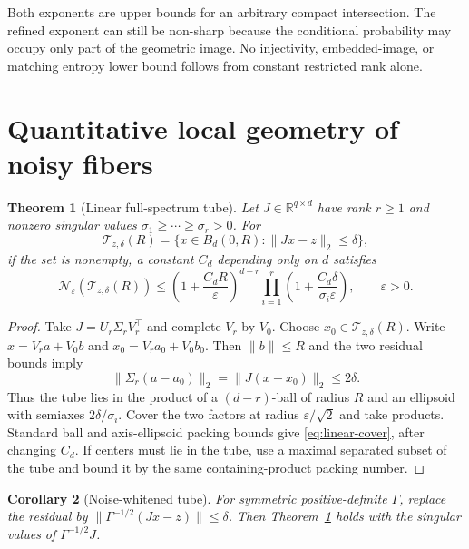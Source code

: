 \documentclass[11pt]{article}
\newtheorem{theorem}{Theorem}[section]
\newtheorem{corollary}[theorem]{Corollary}
\theoremstyle{definition}
\newcommand{\R}{\mathbb R}
\newcommand{\cN}{\mathcal N}
\begin{document}
Both exponents are upper bounds for an arbitrary compact intersection.  The
refined exponent can still be non-sharp because the conditional probability
may occupy only part of the geometric image.  No injectivity, embedded-image,
or matching entropy lower bound follows from constant restricted rank alone.

\section{Quantitative local geometry of noisy fibers}

\begin{theorem}[Linear full-spectrum tube]\label{thm:linear-tube}
Let $J\in\R^{q\times d}$ have rank $r\ge1$ and nonzero singular values
$\sigma_1\ge\cdots\ge\sigma_r>0$.  For
\[
 \mathcal T_{z,\delta}(R)
 =\{x\in B_d(0,R):\|Jx-z\|_2\le\delta\},
\]
if the set is nonempty, a constant $C_d$ depending only on $d$ satisfies
\begin{equation}\label{eq:linear-cover}
 \cN_\varepsilon(\mathcal T_{z,\delta}(R))
 \le \left(1+\frac{C_dR}{\varepsilon}\right)^{d-r}
 \prod_{i=1}^r\left(1+\frac{C_d\delta}
 {\sigma_i\varepsilon}\right),\qquad \varepsilon>0.
\end{equation}
\end{theorem}

\begin{proof}
Take $J=U_r\Sigma_rV_r^\top$ and complete $V_r$ by $V_0$.  Choose
$x_0\in\mathcal T_{z,\delta}(R)$.  Write
$x=V_ra+V_0b$ and $x_0=V_ra_0+V_0b_0$.  Then $\|b\|\le R$ and the two
residual bounds imply
\[
 \|\Sigma_r(a-a_0)\|_2=\|J(x-x_0)\|_2\le2\delta.
\]
Thus the tube lies in the product of a $(d-r)$-ball of radius $R$ and an
ellipsoid with semiaxes $2\delta/\sigma_i$.  Cover the two factors at radius
$\varepsilon/\sqrt2$ and take products.  Standard ball and axis-ellipsoid
packing bounds \citep[Chapter~4]{vershynin2018highdim} give
\eqref{eq:linear-cover}, after changing $C_d$.  If centers
must lie in the tube, use a maximal separated subset of the tube and bound it
by the same containing-product packing number.
\end{proof}

\begin{corollary}[Noise-whitened tube]\label{cor:whitened}
For symmetric positive-definite $\Gamma$, replace the residual by
$\|\Gamma^{-1/2}(Jx-z)\|\le\delta$.  Then
Theorem~\ref{thm:linear-tube} holds with the singular values of
$\Gamma^{-1/2}J$.
\end{corollary}
\end{document}
